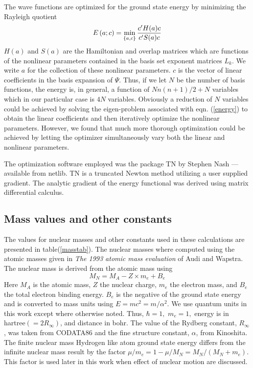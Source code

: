 \documentclass[12pt,thmsa]{article}
\begin{document}
The wave functions are optimized for the ground state energy by minimizing
the Rayleigh quotient 
\begin{equation}
E\left( a;c\right) =\min_{\left\{ a,c\right\} }\frac{c^{\prime }H(a)c}{%
c^{\prime }S(a)c}  \label{energy}
\end{equation}
$H\left( a\right) $ and $S\left( a\right) $ are the Hamiltonian and overlap
matrices which are functions of the nonlinear parameters contained in the
basis set exponent matrices $L_k$. We write $a$ for the collection of these
nonlinear parameters. $c$ is the vector of linear coefficients in the basis
expansion of $\Psi .$ Thus, if we let $N$ be the number of basis functions,
the energy is, in general, a function of $Nn\left( n+1\right) /2+N$
variables which in our particular case is $4N$ variables. Obviously a
reduction of $N$ variables could be achieved by solving the eigen-problem
associated with eqn. (\ref{energy}) to obtain the linear coefficients and
then iteratively optimize the nonlinear parameters. However, we found that
much more thorough optimization could be achieved by letting the optimizer
simultaneously vary both the linear and nonlinear parameters.

The optimization software employed was the package TN by Stephen Nash\cite
{NashTN} --- available from netlib\cite{netlib}. TN is a truncated Newton
method utilizing a user supplied gradient. The analytic gradient of the
energy functional was derived using matrix differential calculus\cite
{Kinghorn95a,Kinghorn95b}.

\subsection{Mass values and other constants}

The values for nuclear masses and other constants used in these calculations
are presented in table(\ref{masstab}). The nuclear masses where computed
using the atomic masses given in \emph{The 1993 atomic mass evaluation} of
Audi and Wapstra\cite{Audi93}. The nuclear mass is derived from the atomic
mass using 
\begin{equation}
M_N=M_A-Z\times m_e+B_e
\end{equation}
Here $M_A$ is the atomic mass, $Z$ the nuclear charge, $m_e$ the electron
mass, and $B_e$ the total electron binding energy. $B_e$ is the negative of
the ground state energy and is converted to mass units using $%
E=mc^2=m/\alpha ^2.$ We use quantum units in this work except where
otherwise noted. Thus, $\hbar =1,$ $m_e=1,$ energy is in hartree$\left(
=2R_\infty \right) $, and distance in bohr. The value of the Rydberg
constant, $R_\infty $, was taken from CODATA86\cite{codata86} and the fine
structure constant, $\alpha $, from Kinoshita\cite{Kinoshita95}. The finite
nuclear mass Hydrogen like atom ground state energy differs from the
infinite nuclear mass result by the factor $\mu /m_e=1-\mu /M_N=M_N/\left(
M_N+m_e\right) .$ This factor is used later in this work when effect of
nuclear motion are discussed.
\end{document}
